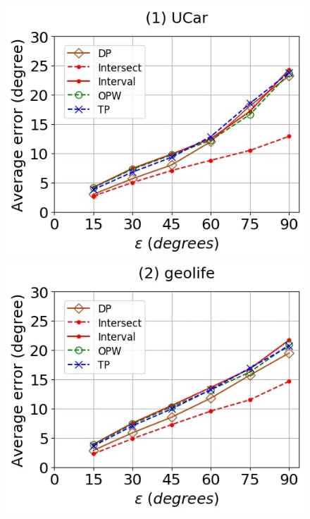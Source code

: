 \begin{figure}[tb!]
	\centering
	\includegraphics[scale=0.250]{Figures/Exp-DAD-error-epsilon-service.jpg}	\hspace{0.5ex}
	\includegraphics[scale=0.250]{Figures/Exp-DAD-error-epsilon-geolife.jpg}	\hspace{0.5ex}

\end{figure}
